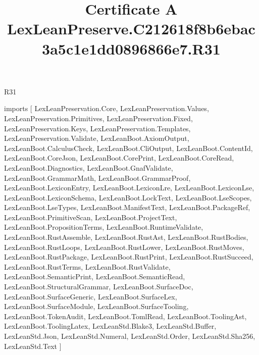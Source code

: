 \begin{lexlean}{R31}
\title{Certificate A LexLeanPreserve.C212618f8b6ebac3a5c1e1dd0896866e7.R31}
\begin{coremodule}
imports [
  LexLeanPreservation.Core,
  LexLeanPreservation.Values,
  LexLeanPreservation.Primitives,
  LexLeanPreservation.Fixed,
  LexLeanPreservation.Keys,
  LexLeanPreservation.Templates,
  LexLeanPreservation.Validate,
  LexLeanBoot.AxiomOutput,
  LexLeanBoot.CalculusCheck,
  LexLeanBoot.CliOutput,
  LexLeanBoot.ContentId,
  LexLeanBoot.CoreJson,
  LexLeanBoot.CorePrint,
  LexLeanBoot.CoreRead,
  LexLeanBoot.Diagnostics,
  LexLeanBoot.GnafValidate,
  LexLeanBoot.GrammarMath,
  LexLeanBoot.GrammarProof,
  LexLeanBoot.LexiconEntry,
  LexLeanBoot.LexiconLre,
  LexLeanBoot.LexiconLse,
  LexLeanBoot.LexiconSchema,
  LexLeanBoot.LockText,
  LexLeanBoot.LseScopes,
  LexLeanBoot.LseTypes,
  LexLeanBoot.ManifestText,
  LexLeanBoot.PackageRef,
  LexLeanBoot.PrimitiveScan,
  LexLeanBoot.ProjectText,
  LexLeanBoot.PropositionTerms,
  LexLeanBoot.RuntimeValidate,
  LexLeanBoot.RustAssemble,
  LexLeanBoot.RustAst,
  LexLeanBoot.RustBodies,
  LexLeanBoot.RustLoops,
  LexLeanBoot.RustLower,
  LexLeanBoot.RustMoves,
  LexLeanBoot.RustPackage,
  LexLeanBoot.RustPrint,
  LexLeanBoot.RustSucceed,
  LexLeanBoot.RustTerms,
  LexLeanBoot.RustValidate,
  LexLeanBoot.SemanticPrint,
  LexLeanBoot.SemanticRead,
  LexLeanBoot.StructuralGrammar,
  LexLeanBoot.SurfaceDoc,
  LexLeanBoot.SurfaceGeneric,
  LexLeanBoot.SurfaceLex,
  LexLeanBoot.SurfaceModule,
  LexLeanBoot.SurfaceTooling,
  LexLeanBoot.TokenAudit,
  LexLeanBoot.TomlRead,
  LexLeanBoot.ToolingAst,
  LexLeanBoot.ToolingLatex,
  LexLeanStd.Blake3,
  LexLeanStd.Buffer,
  LexLeanStd.Json,
  LexLeanStd.Numeral,
  LexLeanStd.Order,
  LexLeanStd.Sha256,
  LexLeanStd.Text
]


\end{coremodule}
\end{lexlean}
